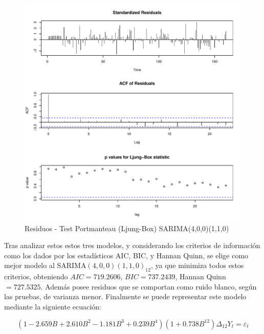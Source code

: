 \documentclass[12pt,oneside]{book}\usepackage[]{graphicx}\usepackage[]{color}
\makeatletter
\def\maxwidth{ %
  \ifdim\Gin@nat@width>\linewidth
    \linewidth
  \else
    \Gin@nat@width
  \fi
}
\newenvironment{knitrout}{}{} %
\theoremstyle{definition} %
\makeatother
\begin{document}
\begin{knitrout}
\color{fgcolor}\begin{figure}[H]

{\centering \includegraphics[width=\maxwidth]{figure/unnamed-chunk-19-1} 

}

\caption{\label{fig:sarima_resid13} Residuos - Test Portmanteau (Ljung-Box) SARIMA(4,0,0)(1,1,0)}\label{fig:unnamed-chunk-19}
\end{figure}


\end{knitrout}


Tras analizar estos estos tres modelos, y considerando los criterios de información como los dados por los estadísticos AIC, BIC, y Hannan Quinn, se elige como mejor modelo al SARIMA$(4,0,0)(1,1,0)_{12}$, ya que minimiza todos estos criterios, obteniendo $AIC=719.2606 $, $BIC=737.2439$, Hannan Quinn$=727.5325$. Además posee residuos que se comportan como ruido blanco, según las pruebas, de  varianza menor. Finalmente se puede representar este modelo mediante la siguiente ecuación:

\begin{equation}\label{eq:sarima}
(1- 2.659 B + 2.610 B^2 - 1.181 B^3  + 0.239 B^4)(1+ 0.738 B^{12})\Delta_{12} Y_t = \varepsilon_t
\end{equation}
\end{document}
